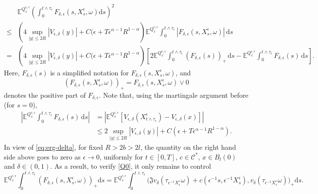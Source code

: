 \documentclass[11pt,reqno]{amsart}
\theoremstyle{definition}
\theoremstyle{remark}
\numberwithin{equation}{section}
\newcommand{\eps}{\epsilon}
\newcommand{\dd}{\mathrm{d}}
\begin{document}
\begin{equation}
\label{eq:Clast}
\begin{aligned}
 & \mathbb E^{Q_x^{c,\epsilon}} \left( \int_0^{t\wedge\tau_\epsilon} F_{\delta,\epsilon}(s,X_s^\epsilon,\omega)\mathrm ds \right)^2 \nonumber \\
\leq & \left(4\sup_{|y|\le 2R}|V_{\eps,\delta}(y)| + C(\eps+T\eps^{\alpha-1}R^{1-\alpha}\right)\mathbb E^{Q_x^{c,\epsilon}}\int_0^{t\wedge \tau_\eps}|F_{\delta,\eps}(s,X^\eps_s,\omega)|\,\dd s\\
= & \left(4\sup_{|y|\le 2R}|V_{\eps,\delta}(y)| + C(\eps+T\eps^{\alpha-1}R^{1-\alpha}\right)\left[2\mathbb E^{Q_x^{c,\epsilon}}\int_0^{t\wedge \tau_\eps}(F_{\delta,\eps}(s))_+\,\dd s - \mathbb E^{Q_x^{c,\epsilon}} \int_0^{t\wedge \tau_\eps} F_{\delta,\eps}(s)\,\dd s\right].
\end{aligned}
\end{equation}
Here, $F_{\delta,\eps}(s)$ is a simplified notation for $F_{\delta,\eps}(s,X^\eps_s,\omega)$, and
\begin{equation*}
    (F_{\delta,\epsilon}(s,X^{\epsilon}_{s},\omega))_{+} = F_{\delta,\epsilon}(s,X^{\epsilon}_{s},\omega) \vee 0
\end{equation*}
denotes the positive part of $F_{\delta,\epsilon}$. Note that, using the martingale argument before (for $s=0$),
\begin{equation*}
\begin{aligned}
    \left|\mathbb E^{Q_x^{c,\epsilon}} \int_0^{t\wedge \tau_\eps} F_{\delta,\eps}(s)\,\dd s\right| &=  \left|\mathbb E^{Q_x^{c,\epsilon}}\left[V_{\eps,\delta}(X^\eps_{t\wedge \tau_\eps}) - V_{\eps,\delta}(x)\right]\right| \\
    &\le 2\sup_{|y|\le 2R}|V_{\eps,\delta}(y)| + C(\eps+T\eps^{\alpha-1}R^{1-\alpha}).
    \end{aligned}
\end{equation*}
In view of \eqref{eq:erg-delta}, for fixed $R>2b>2l$, the quantity on the right hand side above goes to zero as $\eps\to 0$, uniformly for $t\in [0,T]$, $c\in \mathscr{C}^*$, $x\in B_l(0)$ and $\delta\in (0,1)$. As a result, to verify \eqref{Q0}, it only remains to control
\begin{equation*}
    \mathbb{E}^{Q^{c, \epsilon}_{x}} \int^{t\wedge\tau_{\epsilon}}_{0} (F_{\delta,\epsilon}(s,X^{\epsilon}_{s},\omega))_{+}\mathrm{d}s = \mathbb{E}^{Q^{c, \epsilon}_{x}} \int^{t\wedge\tau_{\epsilon}}_{0} \big(\mathfrak{J}v_{\delta}(\tau_{\epsilon^{-1}X^{\epsilon}_{s}}\omega) + c(\epsilon^{-1}s, \epsilon^{-1}X^{\epsilon}_{s}), v_{\delta}(\tau_{\epsilon^{-1}X^{\epsilon}_{s}}\omega)\big)_{+}\mathrm{d}s.
    \end{equation*}
\end{document}
